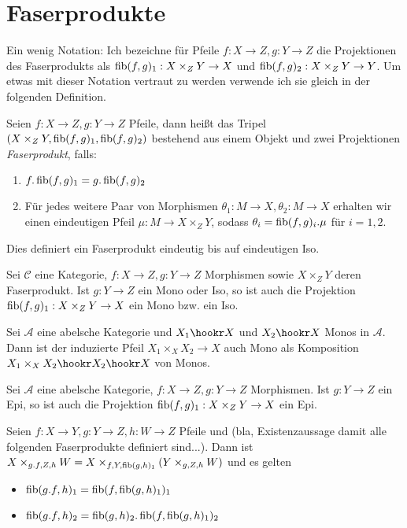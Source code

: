 \section{Faserprodukte}

Ein wenig Notation: Ich bezeichne für Pfeile $f : X\to Z, g: Y\to Z$ die Projektionen des Faserprodukts als $\operatorname{fib}(f,g)_1 : X\times_Z Y \to X$ und $\operatorname{fib}(f,g)_2 : X\times_Z Y \to Y$. Um etwas mit dieser Notation vertraut zu werden verwende ich sie gleich in der folgenden Definition.

\begin{defn}
Seien $f:X\to Z, g:Y\to Z$ Pfeile, dann heißt das Tripel $(X\times_Z Y, \operatorname{fib}(f,g)_1, \operatorname{fib}(f,g)_2)$ bestehend aus einem Objekt und zwei Projektionen \emph{Faserprodukt}, falls:
\begin{enumerate}
\item $f.\operatorname{fib}(f,g)_1 = g.\operatorname{fib}(f,g)_2$
\item Für jedes weitere Paar von Morphismen $\theta_1 : M \to X, \theta_2 : M \to X$ erhalten wir einen eindeutigen Pfeil $\mu : M \to X\times_Z Y$, sodass $\theta_i = \operatorname{fib}(f,g)_i . \mu$ für $i=1,2$.
\end{enumerate}
Dies definiert ein Faserprodukt eindeutig bis auf eindeutigen Iso.
\end{defn}

\begin{prop} Sei $\mathcal C$ eine Kategorie, $f : X \to Z, g : Y\to Z$ Morphismen sowie $X\times_Z Y$ deren Faserprodukt. Ist $g: Y\to Z$ ein Mono oder Iso, so ist auch die Projektion $\operatorname{fib}(f,g)_1: X\times_Z Y \to X$ ein Mono bzw. ein Iso.
\end{prop}

\begin{korr}
Sei $\mathcal A$ eine abelsche Kategorie und
$X_1 \hookr X$ und $X_2 \hookr X$ Monos in $\mathcal A$. Dann ist der induzierte Pfeil $X_1 \times_X X_2 \to X$ auch Mono als Komposition $X_1\times_X X_2 \hookr X_2 \hookr X$ von Monos.
\end{korr}

\begin{prop} Sei $\mathcal A$ eine abelsche Kategorie, $f : X \to Z, g : Y\to Z$ Morphismen. Ist $g: Y\to Z$ ein Epi, so ist auch die Projektion $\operatorname{fib}(f,g)_1: X\times_Z Y \to X$ ein Epi.
\end{prop}

\begin{satz}[Staffelung]
Seien $f: X\to Y,g : Y\to Z,h:W\to Z$ Pfeile und (bla, Existenzaussage damit alle folgenden Faserprodukte definiert sind...). Dann ist $X\times_{g.f,Z,h} W = X\times_{f,Y,\operatorname{fib}(g,h)_1} (Y\times_{g,Z,h} W)$ und es gelten
\begin{itemize}
\item $\operatorname{fib}(g.f,h)_1 = \operatorname{fib}(f,\operatorname{fib}(g,h)_1)_1$
\item $\operatorname{fib}(g.f,h)_2 = \operatorname{fib}(g,h)_2 . \operatorname{fib}(f,\operatorname{fib}(g,h)_1)_2$
\end{itemize}
\end{satz}
